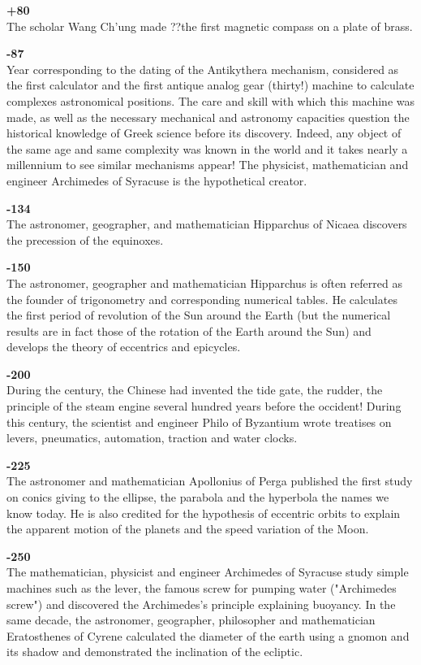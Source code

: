 \textbf{+80}\\
The scholar Wang Ch'ung made ??the first magnetic compass on a plate of brass.

\textbf{-87}\\
Year corresponding to the dating of the Antikythera mechanism, considered as the first calculator and the first antique analog gear (thirty!) machine to calculate complexes astronomical positions. The care and skill with which this machine was made, as well as the necessary mechanical and astronomy capacities question the historical knowledge of Greek science before its discovery. Indeed, any object of the same age and same complexity was known in the world and it takes nearly a millennium to see similar mechanisms appear! The physicist, mathematician and engineer Archimedes of Syracuse is the hypothetical creator.

\textbf{-134}\\
The astronomer, geographer, and mathematician Hipparchus of Nicaea discovers the precession of the equinoxes.

\textbf{-150}\\
The astronomer, geographer and mathematician Hipparchus is often referred as the founder of trigonometry and corresponding numerical tables. He calculates the first period of revolution of the Sun around the Earth (but the numerical results are in fact those of the rotation of the Earth around the Sun) and develops the theory of eccentrics and epicycles.

\textbf{-200}\\
During the century, the Chinese had invented the tide gate, the rudder, the principle of the steam engine several hundred years before the occident! During this century, the scientist and engineer Philo of Byzantium wrote treatises on levers, pneumatics, automation, traction and water clocks.

\textbf{-225}\\
The astronomer and mathematician Apollonius of Perga published the first study on conics giving to the ellipse, the parabola and the hyperbola the names we know today. He is also credited for the hypothesis of eccentric orbits to explain the apparent motion of the planets and the speed variation of the Moon.

\textbf{-250}\\
The mathematician, physicist and engineer Archimedes of Syracuse study simple machines such as the lever, the famous screw for pumping water ("Archimedes screw") and discovered the Archimedes's principle explaining buoyancy. In the same decade, the astronomer, geographer, philosopher and mathematician Eratosthenes of Cyrene calculated the diameter of the earth using a gnomon and its shadow and demonstrated the inclination of the ecliptic.

